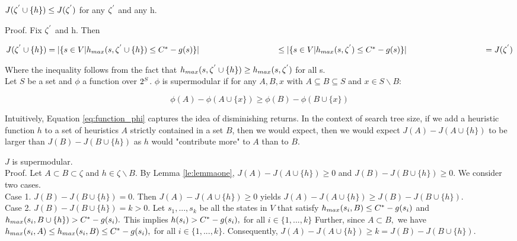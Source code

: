 \begin{lemma}
$J(\zeta\sp{'} \cup \{h\}) \leq J(\zeta\sp{'})$ for any $\zeta\sp{'}$ and any h.

Proof. Fix $\zeta\sp{'}$ and h. Then

$J(\zeta\sp{'} \cup \{h\})  =  |\{s \in V | h_{max}(s, \zeta\sp{'} \cup \{h\}) \leq C\sp{*} - g(s)\}|\\
\hspace*{3.3cm} \leq  |\{s \in V | h_{max}(s,\zeta\sp{'}) \leq C\sp{*} - g(s)\}|\\
\hspace*{3.3cm} = J(\zeta\sp{'}) $

Where the inequality follows from the fact that $h_{max}(s,\zeta\sp{'} \cup \{h\}) \geq h_{max}(s,\zeta\sp{'})$ for all s. \\

Let $S$ be a set and $\phi$ a function over $2\sp{S}$. $\phi$ is supermodular if for any $A, B, x$ with $A \subseteq B \subseteq S$ and $x \in S \backslash B:$

\begin{equation}
\phi(A) - \phi(A \cup \{x\}) \geq \phi(B) - \phi(B \cup \{x\})
\label{eq:function_phi}
\end{equation}

Intuitively, Equation \ref{eq:function_phi} captures the idea of disminishing returns. In the context of search tree size, if we add a heuristic function $h$ to a set of heuristics $A$ strictly contained in a set $B$, then we would expect, then we would expect $J(A) - J(A \cup \{h\})$ to be larger than $J(B) - J(B \cup \{h\})$ as $h$ would "contribute more" to $A$ than to $B$.
\label{le:lemmaone}
\end{lemma}

\begin{lemma}
$J$ is supermodular. \\
Proof. Let $A \subset B \subset \zeta$ and $h \in \zeta \backslash B.$ By Lemma \ref{le:lemmaone}, $J(A) - J(A \cup \{h\}) \geq 0$ and $J(B) - J(B \cup \{h\}) \geq 0$. We consider two cases.\\
Case 1. $J(B) - J(B \cup \{h\}) = 0.$ Then $J(A) - J(A \cup \{h\}) \geq 0$ yields $J(A) - J(A \cup \{h\}) \geq J(B) - J(B \cup \{h\})$.\\
Case 2. $J(B) - J(B \cup \{h\}) = k > 0.$ Let $s_{1},...,s_{k}$ be all the states in $V$ that satisfy $h_{max}(s_{i}, B) \leq  C\sp{*} - g(s_{i})$ and $h_{max}(s_{i}, B \cup \{h\}) > C\sp{*} - g(s_{i}).$  This implies $h(s_{i}) > C\sp{*} - g(s_{i}),$ for all $i \in \{1,...,k\}$ Further, since $A \subset B,$ we have $h_{max}(s_{i}, A) \leq h_{max}(s_{i},B) \leq C\sp{*} - g(s_{i}),$ for all $i \in \{1,...,k\}.$ Consequently, $J(A) - J(A \cup \{h\}) \geq k = J(B) - J(B \cup \{h\}).$
\label{le:lemmatwo}
\end{lemma}

